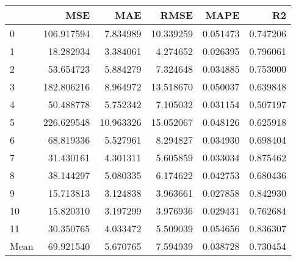\begin{tabular}{lrrrrr}
\toprule
 & MSE & MAE & RMSE & MAPE & R2 \\
\midrule
0 & 106.917594 & 7.834989 & 10.339259 & 0.051473 & 0.747206 \\
1 & 18.282934 & 3.384061 & 4.274652 & 0.026395 & 0.796061 \\
2 & 53.654723 & 5.884279 & 7.324648 & 0.034885 & 0.753000 \\
3 & 182.806216 & 8.964972 & 13.518670 & 0.050037 & 0.639848 \\
4 & 50.488778 & 5.752342 & 7.105032 & 0.031154 & 0.507197 \\
5 & 226.629548 & 10.963326 & 15.052067 & 0.048126 & 0.625918 \\
6 & 68.819336 & 5.527961 & 8.294827 & 0.034930 & 0.698404 \\
7 & 31.430161 & 4.301311 & 5.605859 & 0.033034 & 0.875462 \\
8 & 38.144297 & 5.080335 & 6.174622 & 0.042753 & 0.680436 \\
9 & 15.713813 & 3.124838 & 3.963661 & 0.027858 & 0.842930 \\
10 & 15.820310 & 3.197299 & 3.976936 & 0.029431 & 0.762684 \\
11 & 30.350765 & 4.033472 & 5.509039 & 0.054656 & 0.836307 \\
Mean & 69.921540 & 5.670765 & 7.594939 & 0.038728 & 0.730454 \\
\bottomrule
\end{tabular}
